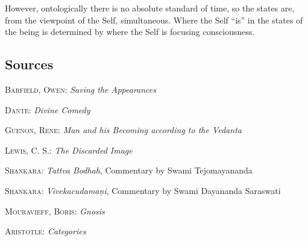 However, ontologically there is no absolute standard of time, so the states are, from the viewpoint of the Self, simultaneous. Where the Self “is” in the states of the being is determined by where the Self is focusing consciousness.

\subsection*{Sources}

\textsc{Barfield, Owen}: \emph{Saving the Appearances}

\textsc{Dante}: \emph{Divine Comedy}

\textsc{Guenon, Rene}: \emph{Man and his Becoming according to the Vedanta}

\textsc{Lewis, C. S.}: \emph{The Discarded Image}

\textsc{Shankara}: \emph{Tattva Bodhah}, Commentary by Swami Tejomayananda

\textsc{Shankara}: \emph{Vivekacudama\d ni}, Commentary by Swami Dayananda Saraswati

\textsc{Mouravieff, Boris}: \emph{Gnosis}

\textsc{Aristotle}: \emph{Categories}

